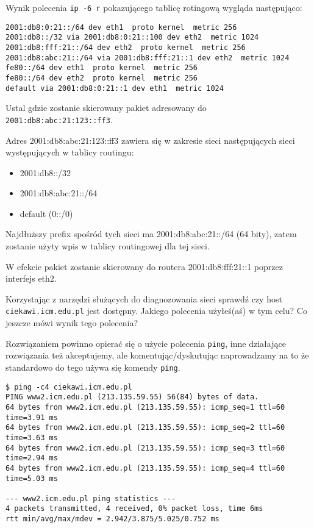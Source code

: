 \dbEntryCheckResults
Wynik polecenia \Verb#ip -6 r# pokazującego tablicę rotingową wygląda następująco:
\begin{Verbatim}
2001:db8:0:21::/64 dev eth1  proto kernel  metric 256 
2001:db8::/32 via 2001:db8:0:21::100 dev eth2  metric 1024 
2001:db8:fff:21::/64 dev eth2  proto kernel  metric 256 
2001:db8:abc:21::/64 via 2001:db8:fff:21::1 dev eth2  metric 1024 
fe80::/64 dev eth1  proto kernel  metric 256 
fe80::/64 dev eth2  proto kernel  metric 256 
default via 2001:db8:0:21::1 dev eth1  metric 1024 
\end{Verbatim}

Ustal gdzie zostanie skierowany pakiet adresowany do \Verb$2001:db8:abc:21:123::ff3$.
\fi

\dbEntryCheckResults
Adres 2001:db8:abc:21:123::ff3 zawiera się w zakresie sieci następujących sieci występujących w tablicy routingu:
\begin{itemize}
	\item 2001:db8::/32
	\item 2001:db8:abc:21::/64 
	\item default (0::/0)
\end{itemize}

Najdłuższy prefix spośród tych sieci ma 2001:db8:abc:21::/64 (64 bity), zatem zostanie użyty wpis w tablicy routingowej dla tej sieci.

W efekcie pakiet zostanie skierowany do routera 2001:db8:fff:21::1 poprzez interfejs eth2.
\fi


\dbEntryCheckResults
Korzystając z narzędzi służących do diagnozowania sieci sprawdź czy host \Verb#ciekawi.icm.edu.pl# jest dostępny.
Jakiego polecenia użyłeś(aś) w tym celu? Co jeszcze mówi wynik tego polecenia?

\begin{teacherOnly}
Rozwiązaniem powinno opierać się o użycie polecenia \Verb#ping#, inne działające rozwiązania też akceptujemy, ale komentując/dyskutując naprowadzamy na to że standardowo do tego używa się komendy \Verb#ping#.
\end{teacherOnly}
\fi

\dbEntryCheckResults
\begin{Verbatim}
$ ping -c4 ciekawi.icm.edu.pl
PING www2.icm.edu.pl (213.135.59.55) 56(84) bytes of data.
64 bytes from www2.icm.edu.pl (213.135.59.55): icmp_seq=1 ttl=60 time=3.91 ms
64 bytes from www2.icm.edu.pl (213.135.59.55): icmp_seq=2 ttl=60 time=3.63 ms
64 bytes from www2.icm.edu.pl (213.135.59.55): icmp_seq=3 ttl=60 time=2.94 ms
64 bytes from www2.icm.edu.pl (213.135.59.55): icmp_seq=4 ttl=60 time=5.03 ms

--- www2.icm.edu.pl ping statistics ---
4 packets transmitted, 4 received, 0% packet loss, time 6ms
rtt min/avg/max/mdev = 2.942/3.875/5.025/0.752 ms
\end{Verbatim}

